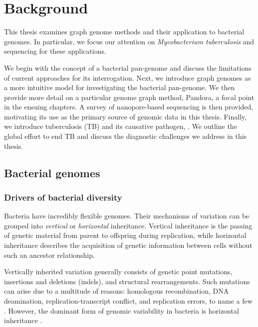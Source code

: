 \chapter{Background}

This thesis examines graph genome methods and their application to bacterial genomes. In particular, we focus our attention on \textit{Mycobacterium tuberculosis} and \ont{} sequencing for these applications. 

We begin with the concept of a bacterial pan-genome and discuss the limitations of current approaches for its interrogation. Next, we introduce graph genomes as a more intuitive model for investigating the bacterial pan-genome. We then provide more detail on a particular genome graph method, Pandora, a focal point in the ensuing chapters. A survey of nanopore-based sequencing is then provided, motivating its use as the primary source of genomic data in this thesis. Finally, we introduce tuberculosis (TB) and its causative pathogen, \mtb{}. We outline the global effort to end TB and discuss the diagnostic challenges we address in this thesis.

\section{Bacterial genomes}

\subsection{Drivers of bacterial diversity}

Bacteria have incredibly flexible genomes. Their mechanisms of variation can be grouped into \emph{vertical} or \emph{horizontal} inheritance. Vertical inheritance is the passing of genetic material from parent to offspring during replication, while horizontal inheritance describes the acquisition of genetic information between cells without such an ancestor relationship. 

Vertically inherited variation generally consists of genetic point mutations, insertions and deletions (indels), and structural rearrangements. Such mutations can arise due to a multitude of reasons: homologous recombination, DNA deamination, replication-transcript conflict, and replication errors, to name a few \cite{Lan2000}. However, the dominant form of genomic variability in bacteria is horizontal inheritance \cite{McInerney2017}.

